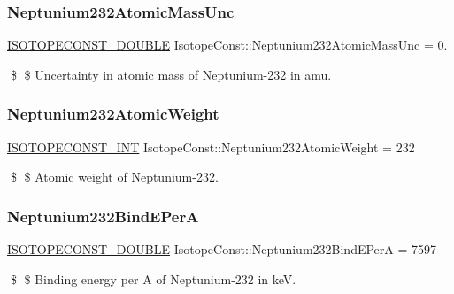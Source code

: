 \subsubsection{\texorpdfstring{Neptunium232\+Atomic\+Mass\+Unc}{Neptunium232AtomicMassUnc}}
{\footnotesize\ttfamily \mbox{\hyperlink{group___isotope_const-_macros_ga8f45a7272ce02c0b4c65c44636ed719a}{I\+S\+O\+T\+O\+P\+E\+C\+O\+N\+S\+T\+\_\+\+D\+O\+U\+B\+LE}} Isotope\+Const\+::\+Neptunium232\+Atomic\+Mass\+Unc = 0.}

\$ \$ Uncertainty in atomic mass of Neptunium-\/232 in amu. \mbox{\label{group___isotope_const-_neptunium-_np232_ga3981ee9cab151652728f0735493fd92f}} 
\subsubsection{\texorpdfstring{Neptunium232\+Atomic\+Weight}{Neptunium232AtomicWeight}}
{\footnotesize\ttfamily \mbox{\hyperlink{group___isotope_const-_macros_ga5f18360b3e99483a35c32d789e62621c}{I\+S\+O\+T\+O\+P\+E\+C\+O\+N\+S\+T\+\_\+\+I\+NT}} Isotope\+Const\+::\+Neptunium232\+Atomic\+Weight = 232}

\$ \$ Atomic weight of Neptunium-\/232. \mbox{\label{group___isotope_const-_neptunium-_np232_ga5dd097ec82839342fa80e2998970fcd8}} 
\subsubsection{\texorpdfstring{Neptunium232\+Bind\+E\+PerA}{Neptunium232BindEPerA}}
{\footnotesize\ttfamily \mbox{\hyperlink{group___isotope_const-_macros_ga8f45a7272ce02c0b4c65c44636ed719a}{I\+S\+O\+T\+O\+P\+E\+C\+O\+N\+S\+T\+\_\+\+D\+O\+U\+B\+LE}} Isotope\+Const\+::\+Neptunium232\+Bind\+E\+PerA = 7597}

\$ \$ Binding energy per A of Neptunium-\/232 in keV. \mbox{\label{group___isotope_const-_neptunium-_np232_ga877910eb0835e9614a16b169507f9e9c}} 
